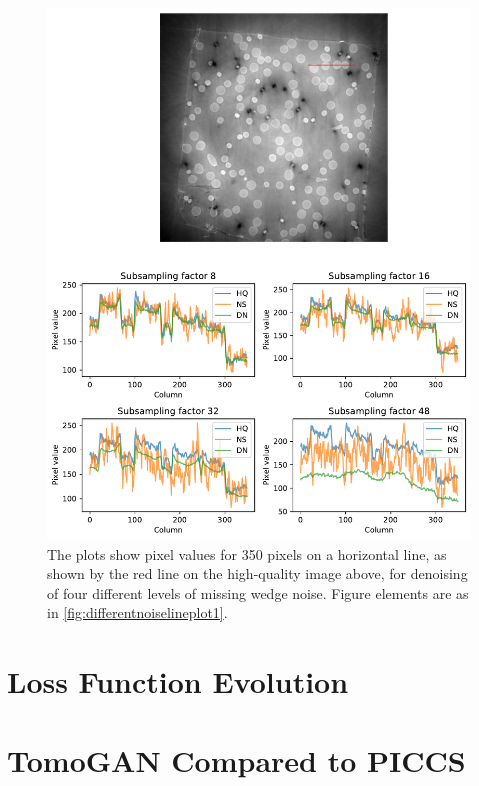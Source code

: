 \begin{figure}[htbp]
  \centering
  \includegraphics[width=.95\textwidth]{figures/differentnoiselineplot2.pdf}
  \caption[Line plot of denoising of different levels of noise]{The plots show pixel values for 350 pixels on a horizontal line, as shown by the red line on the high-quality image above, for denoising of four different levels of missing wedge noise. Figure elements are as in \cref{fig:differentnoiselineplot1}. }
  \label{fig:differentnoiselineplot2}
\end{figure}

\section{Loss Function Evolution}

\section{TomoGAN Compared to PICCS}

